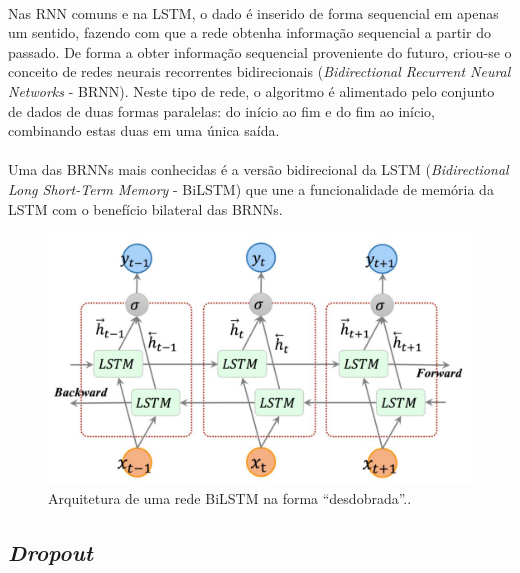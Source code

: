 \documentclass[grad,numbers]{coppe}
\begin{document}
  		\paragraph{}Nas RNN comuns e na LSTM, o dado é inserido de forma sequencial em apenas um sentido, fazendo com que a rede obtenha informação sequencial a partir do passado. De forma a obter informação sequencial proveniente do futuro, criou-se o conceito de redes neurais recorrentes bidirecionais (\textit{Bidirectional Recurrent Neural Networks} - BRNN). Neste tipo de rede, o algoritmo é alimentado pelo conjunto de dados de duas formas paralelas: do início ao fim e do fim ao início, combinando estas duas em uma única saída.
  		\paragraph{}Uma das BRNNs mais conhecidas é a versão bidirecional da LSTM (\textit{Bidirectional Long Short-Term Memory} - BiLSTM) que une a funcionalidade de memória da LSTM com o benefício bilateral das BRNNs.
		\begin{figure}[h]
			\centering
			\includegraphics[width=12cm]{bilstm-schema.jpg}
			\caption{Arquitetura de uma rede BiLSTM na forma ``desdobrada''.\cite{bilstm-schema}.}
			\label{fig:bilstm-schema-fig}
		\end{figure}
  	\subsection{\textit{Dropout}}
\end{document}
